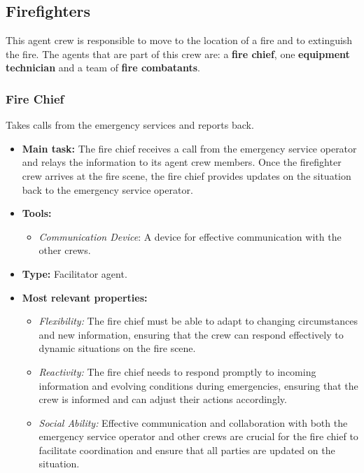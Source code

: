 \subsection{Firefighters}
This agent crew is responsible to move to the location of a fire and to extinguish the fire.
\newline The agents that are part of this crew are: a \textbf{fire chief}, one \textbf{equipment technician} and a team of \textbf{fire combatants}.

\subsubsection{Fire Chief}
Takes calls from the emergency services and reports back.

\begin{itemize}
    \item \textbf{Main task:} The fire chief receives a call from the emergency service operator and relays the information to its agent crew members. Once the firefighter crew arrives at the fire scene, the fire chief provides updates on the situation back to the emergency service operator.
    \item \textbf{Tools:}
    \begin{itemize}
        \item \textit{Communication Device}: A device for effective communication with the other crews.
    \end{itemize}
    \item \textbf{Type:} Facilitator agent.
    \item \textbf{Most relevant properties:}
    \begin{itemize}
        \item \textit{Flexibility:} The fire chief must be able to adapt to changing circumstances and new information, ensuring that the crew can respond effectively to dynamic situations on the fire scene.
        \item \textit{Reactivity:} The fire chief needs to respond promptly to incoming information and evolving conditions during emergencies, ensuring that the crew is informed and can adjust their actions accordingly.
        \item \textit{Social Ability:} Effective communication and collaboration with both the emergency service operator and other crews are crucial for the fire chief to facilitate coordination and ensure that all parties are updated on the situation.
    \end{itemize}
\end{itemize}

